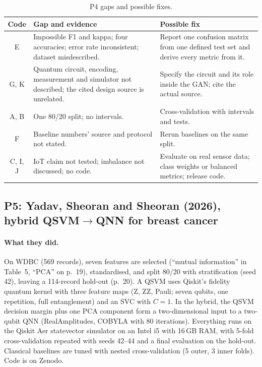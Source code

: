 \documentclass[11pt,a4paper]{article}
\begin{document}
\begin{table}[H]
\centering\footnotesize
\caption{P4 gaps and possible fixes.}
\begin{tabularx}{\textwidth}{c Y Y}
\toprule
Code & Gap and evidence & Possible fix \\
\midrule
E & Impossible F1 and kappa; four accuracies; error rate inconsistent; dataset misdescribed. & Report one confusion matrix from one defined test set and derive every metric from it. \\
G, K & Quantum circuit, encoding, measurement and simulator not described; the cited design source is unrelated. & Specify the circuit and its role inside the GAN; cite the actual source. \\
A, B & One 80/20 split; no intervals. & Cross-validation with intervals and tests. \\
F & Baseline numbers' source and protocol not stated. & Rerun baselines on the same split. \\
C, I, J & IoT claim not tested; imbalance not discussed; no code. & Evaluate on real sensor data; class weights or balanced metrics; release code. \\
\bottomrule
\end{tabularx}
\end{table}

\subsection{P5: Yadav, Sheoran and Sheoran (2026), hybrid QSVM$\to$QNN for breast cancer}
\label{sec:p5}
\paragraph{What they did.} On WDBC (569 records), seven features are selected (``mutual information'' in Table~5, ``PCA'' on p.~19), standardised, and split 80/20 with stratification (seed 42), leaving a 114-record hold-out (p.~20). A QSVM uses Qiskit's fidelity quantum kernel with three feature maps (Z, ZZ, Pauli; seven qubits, one repetition, full entanglement) and an SVC with $C=1$. In the hybrid, the QSVM decision margin plus one PCA component form a two-dimensional input to a two-qubit QNN (RealAmplitudes, COBYLA with 80 iterations). Everything runs on the Qiskit Aer statevector simulator on an Intel i5 with 16\,GB RAM, with 5-fold cross-validation repeated with seeds 42--44 and a final evaluation on the hold-out. Classical baselines are tuned with nested cross-validation (5 outer, 3 inner folds). Code is on Zenodo.
\end{document}
